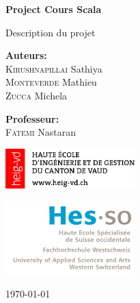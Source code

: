 \begin{titlepage}
    \begin{center}

	 \vspace{0.5cm}
     {\fontsize{1.5cm}{1.8cm} \bf Project Cours Scala}\par
     \vspace{0.5cm}
     {\fontsize{0.9cm}{1.3cm} \selectfont Description du projet}\par
     \vspace{3cm}
     \vfill
        
        \begin{minipage}{0.4\textwidth}
        	\begin{flushleft} \large
        		\textbf{Auteurs:}\\
        		\textsc{Kirushnapillai} Sathiya \\
        		\textsc{Monteverde} Mathieu \\
        		\textsc{Zucca} Michela
        	\end{flushleft}
        \end{minipage}
        \begin{minipage}{0.4\textwidth}
            \begin{flushright} \large
                \textbf{Professeur:} \\
                \textsc{Fatemi} Nastaran \\
            \end{flushright}
        \end{minipage}
    
        \vfill
    \begin{minipage}{0.4\textwidth}
    	\begin{flushleft} \large
       		\includegraphics[width=5cm]{images/logo_heig.png}
        \end{flushleft}

	\end{minipage}
	\begin{minipage}{0.4\textwidth}
	    \begin{flushright}
			\includegraphics[width=5cm]{images/logo-hes-so.jpg}
		\end{flushright}
	\end{minipage}


        \today
        
    \end{center}
\end{titlepage}

